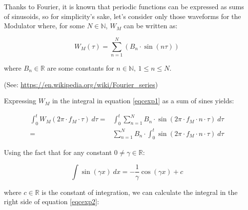 \documentclass{article}
\begin{document}
    Thanks to Fourier, it is known that periodic functions can be expressed as
    sums of sinusoids, so for simplicity's sake, let's consider only those
    waveforms for the Modulator where, for some $N \in \mathbb{N}$, $W_M$ can
    be written as:

    \begin{equation}\label{eqmfur}
      W_M(\tau) = \sum_{n=1}^{N} \left( B_n \cdot \sin(n\tau) \right)
    \end{equation}

    where $B_n \in \mathbb{R}$ are some constants for
    $n \in \mathbb{N}, \  1 \le n \le N$.

    (See: \url{https://en.wikipedia.org/wiki/Fourier\_series})

    Expressing $W_M$ in the integral in equation \ref{eqcexp1} as a sum of
    sines yields:

    \begin{equation}\label{eqcexp2}
      \begin{split}
        \int_{0}^{t} W_M(2\pi \cdot f_M \cdot \tau) \ d\tau
          = & \int_{0}^{t}
                \sum_{n=1}^{N} B_n \cdot \sin(2\pi \cdot f_M \cdot n \cdot \tau)
              \ d\tau \\
          = & \sum_{n=1}^{N}
                B_n \cdot \int_{0}^{t}
                  \sin(2\pi \cdot f_M \cdot n \cdot \tau)
                \ d\tau
      \end{split}
    \end{equation}

    Using the fact that for any constant $0 \neq \gamma \in \mathbb{R}$:

    \begin{equation}
      \int \sin(\gamma x) \ dx = - \frac{1}{\gamma} \cos(\gamma x) + c
    \end{equation}

    where $c \in \mathbb{R}$ is the constant of integration, we can calculate
    the integral in the right side of equation \ref{eqcexp2}:
\end{document}
